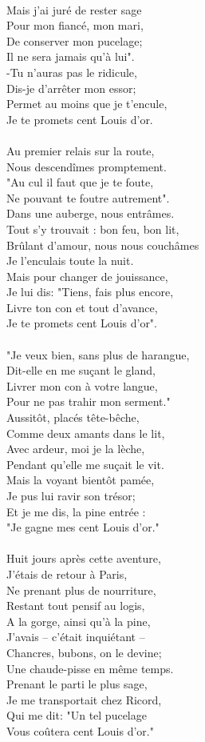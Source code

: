 \\Mais j'ai juré de rester sage
\\Pour mon fiancé, mon mari,
\\De conserver mon pucelage;
\\Il ne sera jamais qu'à lui".
\\-Tu n'auras pas le ridicule,
\\Dis-je d'arrêter mon essor;
\\Permet au moins que je t'encule,
\\Je te promets cent Louis d'or.
\\\\Au premier relais sur la route,
\\Nous descendîmes promptement.
\\"Au cul il faut que je te foute,
\\Ne pouvant te foutre autrement".
\\Dans une auberge, nous entrâmes.
\\Tout s'y trouvait : bon feu, bon lit,
\\Brûlant d'amour, nous nous couchâmes
\\Je l'enculais toute la nuit.
\\Mais pour changer de jouissance,
\\Je lui dis: "Tiens, fais plus encore,
\\Livre ton con et tout d'avance,
\\Je te promets cent Louis d'or".
\\\\"Je veux bien, sans plus de harangue,
\\Dit-elle en me suçant le gland,
\\Livrer mon con à votre langue,
\\Pour ne pas trahir mon serment."
\\Aussitôt, placés tête-bêche,
\\Comme deux amants dans le lit,
\\Avec ardeur, moi je la lèche,
\\Pendant qu'elle me suçait le vit.
\\Mais la voyant bientôt pamée,
\\Je pus lui ravir son trésor;
\\Et je me dis, la pine entrée :
\\"Je gagne mes cent Louis d'or."
\\\\Huit jours après cette aventure,
\\J'étais de retour à Paris,
\\Ne prenant plus de nourriture,
\\Restant tout pensif au logis,
\\A la gorge, ainsi qu'à la pine,
\\J'avais – c'était inquiétant –
\\Chancres, bubons, on le devine;
\\Une chaude-pisse en même temps.
\\Prenant le parti le plus sage,
\\Je me transportait chez Ricord,
\\Qui me dit: "Un tel pucelage
\\Vous coûtera cent Louis d'or."


\breakpage